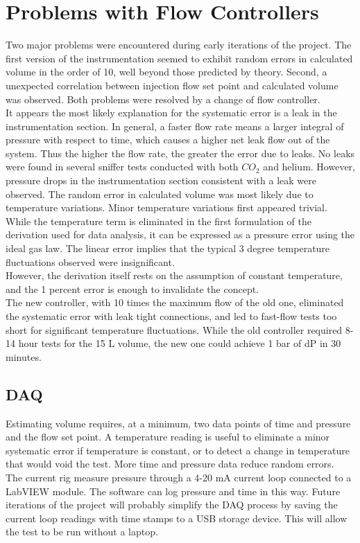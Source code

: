 \documentclass{report}
\begin{document}
\section{Problems with Flow Controllers}
Two major problems were encountered during early iterations of the project. 
The first version of the instrumentation seemed to exhibit random errors in calculated volume in the order of 10, well beyond those predicted by theory. Second, a unexpected correlation between injection flow set point and calculated volume was observed. 
Both problems were resolved by a change of flow controller. \\
It appears the most likely explanation for the systematic error is a leak in the instrumentation section. In general, a faster flow rate means a larger integral of pressure with respect to time, which causes a higher net leak flow out of the system. Thus the higher the flow rate, the greater the error due to leaks. 
No leaks were found in several sniffer tests conducted with both $CO_2$ and helium. However, pressure drops in the instrumentation section  consistent with a leak were observed.
The random error in calculated volume was most likely due to temperature variations. Minor temperature variations first appeared trivial. While the temperature term is eliminated in the first formulation of the derivation used for data analysis, it can be expressed as a pressure error using the ideal gas law. The linear error implies that the typical 3 degree temperature fluctuations observed were insignificant. \\However, the derivation itself rests on the assumption of constant temperature, and the 1 percent error is enough to invalidate the concept. \\
The new controller, with 10 times the maximum flow of the old one,  eliminated the systematic error with leak tight connections, and  led to fast-flow tests too short for significant temperature fluctuations. While the old controller required 8-14 hour tests for the 15 L volume, the new one could achieve 1 bar of dP in 30 minutes.
\subsection{DAQ}
Estimating volume requires, at a minimum, two data points of time and pressure and the flow set point. A temperature reading is useful to eliminate a minor systematic error if temperature is constant, or to detect a change in temperature that would void the test. More time and pressure data reduce random errors. \\
The current rig measure pressure through a 4-20 mA current loop connected to a LabVIEW module. The software can log pressure and time in this way. Future iterations of the project will probably simplify the DAQ process by saving the current loop readings with time stamps to a USB storage device. This will allow the test to be run without a laptop. 
\end{document}
